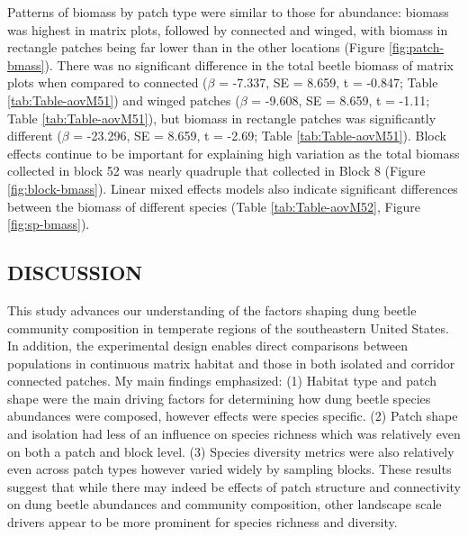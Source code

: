 \documentclass[
  man, donotrepeattitle]{apa6}
\begin{document}
Patterns of biomass by patch type were similar to those for abundance: biomass was highest in matrix plots, followed by connected and winged, with biomass in rectangle patches being far lower than in the other locations (Figure \ref{fig:patch-bmass}). There was no significant difference in the total beetle biomass of matrix plots when compared to connected (\(\beta\) = -7.337, SE = 8.659, t = -0.847; Table \ref{tab:Table-aovM51}) and winged patches (\(\beta\) = -9.608, SE = 8.659, t = -1.11; Table \ref{tab:Table-aovM51}), but biomass in rectangle patches was significantly different (\(\beta\) = -23.296, SE = 8.659, t = -2.69; Table \ref{tab:Table-aovM51}). Block effects continue to be important for explaining high variation as the total biomass collected in block 52 was nearly quadruple that collected in Block 8 (Figure \ref{fig:block-bmass}). Linear mixed effects models also indicate significant differences between the biomass of different species (Table \ref{tab:Table-aovM52}, Figure \ref{fig:sp-bmass}).

\subsection{DISCUSSION}\label{discussion}

This study advances our understanding of the factors shaping dung beetle community composition in temperate regions of the southeastern United States. In addition, the experimental design enables direct comparisons between populations in continuous matrix habitat and those in both isolated and corridor connected patches. My main findings emphasized: (1) Habitat type and patch shape were the main driving factors for determining how dung beetle species abundances were composed, however effects were species specific. (2) Patch shape and isolation had less of an influence on species richness which was relatively even on both a patch and block level. (3) Species diversity metrics were also relatively even across patch types however varied widely by sampling blocks. These results suggest that while there may indeed be effects of patch structure and connectivity on dung beetle abundances and community composition, other landscape scale drivers appear to be more prominent for species richness and diversity.
\end{document}
